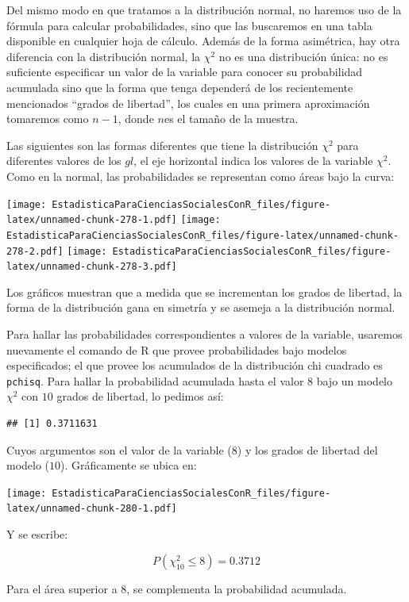 \documentclass[]{book}
\begin{document}
Del mismo modo en que tratamos a la distribución normal, no haremos uso
de la fórmula para calcular probabilidades, sino que las buscaremos en
una tabla disponible en cualquier hoja de cálculo. Además de la forma
asimétrica, hay otra diferencia con la distribución normal, la
\(\chi^{2}\) no es una distribución única: no es suficiente especificar un valor de la variable para conocer su probabilidad acumulada sino que la forma que tenga dependerá de los recientemente mencionados ``grados de libertad'', los cuales en una primera aproximación tomaremos como \(n-1\), donde \(n\)es el tamaño de la muestra.

Las siguientes son las formas diferentes que tiene la distribución
\(\chi^{2}\) para diferentes valores de los \(gl\), el eje horizontal indica los valores de la variable \(\chi^{2}\). Como en la normal, las
probabilidades se representan como áreas bajo la curva:

\texttt{[image: EstadisticaParaCienciasSocialesConR\_files/figure-latex/unnamed-chunk-278-1.pdf]} \texttt{[image: EstadisticaParaCienciasSocialesConR\_files/figure-latex/unnamed-chunk-278-2.pdf]} \texttt{[image: EstadisticaParaCienciasSocialesConR\_files/figure-latex/unnamed-chunk-278-3.pdf]}

Los gráficos muestran que a medida que se incrementan los grados de
libertad, la forma de la distribución gana en simetría y se asemeja a la distribución normal.

Para hallar las probabilidades correspondientes a valores de la
variable, usaremos nuevamente el comando de R que provee probabilidades bajo modelos especificados; el que provee los acumulados de la distribución chi cuadrado es \texttt{pchisq}. Para hallar la probabilidad acumulada hasta el valor 8 bajo un modelo \(\chi^{2}\) con \(10\) grados de libertad, lo pedimos así:

\begin{verbatim}
## [1] 0.3711631
\end{verbatim}

Cuyos argumentos son el valor de la variable (\(8\)) y los grados de libertad del modelo (\(10\)). Gráficamente se ubica en:

\texttt{[image: EstadisticaParaCienciasSocialesConR\_files/figure-latex/unnamed-chunk-280-1.pdf]}

Y se escribe:

\[P(\chi_{10}^{2} \leq 8) = 0.3712\]

Para el área superior a 8, se complementa la probabilidad acumulada.
\end{document}
